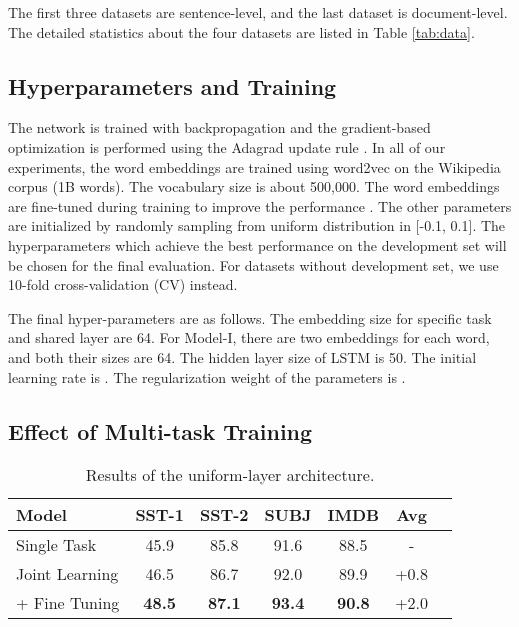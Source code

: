 \documentclass{article}
\begin{document}
The first three datasets are sentence-level, and the last dataset is document-level. The detailed statistics about the four datasets are listed in Table \ref{tab:data}.



\subsection{Hyperparameters and Training}
The network is trained with backpropagation and the gradient-based optimization is performed using the Adagrad update rule \cite{duchi2011adaptive}.
In all of our experiments, the word embeddings are trained using word2vec \cite{mikolov2013efficient} on the Wikipedia corpus (1B words). The vocabulary size is about 500,000. The word embeddings are fine-tuned during training to improve the performance \cite{collobert2011natural}. The other parameters are initialized by randomly sampling from uniform distribution in [-0.1, 0.1].
The hyperparameters which achieve the best performance on the development set will be chosen for the final evaluation. For datasets without development set, we use 10-fold cross-validation (CV) instead.

The final hyper-parameters are as follows. The embedding size for specific task and shared layer are 64. For Model-I, there are two embeddings for each word, and both their sizes are 64. The hidden layer size of LSTM is 50. The initial learning rate is . The regularization weight of the parameters is .




\subsection{Effect of Multi-task Training}


\begin{table}[!th]\small
\center
\begin{tabular}{|l|*{6}{c|}}
\hline
\textbf{Model} &	 SST-1 &	 SST-2 &	SUBJ&	 IMDB  & Avg\\
\hline
Single Task &   45.9    &   85.8    &   91.6    &   88.5    & - \\
\hline
Joint Learning &   46.5    &   86.7    &   92.0    &   89.9  & +0.8   \\
+ Fine Tuning &   \textbf{48.5}    &   \textbf{87.1}    &   \textbf{93.4}    &   \textbf{90.8} & +2.0   \\
\hline
\end{tabular}
\caption{Results of the uniform-layer architecture. }\label{tab:result-1}
\end{table}
\end{document}
